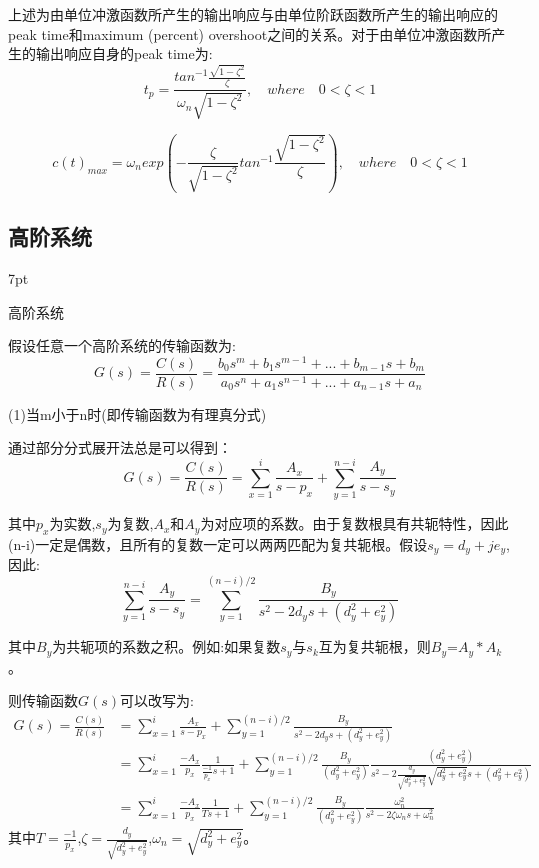 \documentclass{article}
\numberwithin{equation}{section}
\numberwithin{figure}{section}
\newenvironment{formal}{%
\def\FrameCommand{%
\hspace{1pt}%
{\color{DarkBlue}\vrule width 2pt}%
{\color{formalshade}\vrule width 4pt}%
\colorbox{formalshade}%
}%
\MakeFramed{\advance\hsize-\width\FrameRestore}%
\noindent\hspace{-4.55pt}%
\begin{adjustwidth}{}{7pt}%
\vspace{2pt}\vspace{2pt}%
}
{%
\vspace{2pt}\end{adjustwidth}\endMakeFramed%
}
\begin{document}
上述为由单位冲激函数所产生的输出响应与由单位阶跃函数所产生的输出响应的peak time和maximum (percent) overshoot之间的关系。对于由单位冲激函数所产生的输出响应自身的peak time为:
\begin{equation}
    t_p=\frac{tan^{-1}\frac{\sqrt{1-\zeta^2}}{\zeta}}{\omega_n\sqrt{1-\zeta^2}},\quad where\quad 0<\zeta<1
\end{equation}

\begin{equation}
    c(t)_{max}=\omega_nexp(-\frac{\zeta}{\sqrt{1-\zeta^2}}tan^{-1}\frac{\sqrt{1-\zeta^2}}{\zeta}),\quad where\quad 0<\zeta<1
\end{equation}

\subsection{高阶系统}

\begin{formal}
    高阶系统
\end{formal}

假设任意一个高阶系统的传输函数为:
\begin{equation}
    G(s)=\frac{C(s)}{R(s)}=\frac{b_0s^m+b_1s^{m-1}+...+b_{m-1}s+b_m}{a_0s^n+a_1s^{n-1}+...+a_{n-1}s+a_n}
\end{equation}

(1)当m小于n时(即传输函数为有理真分式)

通过部分分式展开法总是可以得到：
\begin{equation}
    G(s)=\frac{C(s)}{R(s)}=\sum_{x = 1}^{i}\frac{A_x}{s-p_x}+\sum_{y = 1}^{n-i}\frac{A_y}{s-s_y}
\end{equation}

其中$p_x$为实数,$s_y$为复数,$A_x$和$A_y$为对应项的系数。由于复数根具有共轭特性，因此(n-i)一定是偶数，且所有的复数一定可以两两匹配为复共轭根。假设$s_y=d_y+je_y$,因此:
\begin{equation}
    \sum_{y = 1}^{n-i}\frac{A_y}{s-s_y}=\sum_{y = 1}^{(n-i)/2}\frac{B_y}{s^2-2d_ys+(d_y^2+e_y^2)}
\end{equation}

其中$B_y$为共轭项的系数之积。例如:如果复数$s_y$与$s_k$互为复共轭根，则$B_y$=$A_y*A_k$。

则传输函数$G(s)$可以改写为:
\begin{equation}
    \begin{split}
        G(s)=\frac{C(s)}{R(s)}&=\sum_{x = 1}^{i}\frac{A_x}{s-p_x}+\sum_{y = 1}^{(n-i)/2}\frac{B_y}{s^2-2d_ys+(d_y^2+e_y^2)}\\
        &=\sum_{x = 1}^{i}\frac{-A_x}{p_x}\frac{1}{\frac{-1}{p_x}s+1}+\sum_{y = 1}^{(n-i)/2}\frac{B_y}{(d_y^2+e_y^2)}\frac{(d_y^2+e_y^2)}{s^2-2\frac{d_y}{\sqrt{d_y^2+e_y^2}}\sqrt{d_y^2+e_y^2}s+(d_y^2+e_y^2)}\\
        &=\sum_{x = 1}^{i}\frac{-A_x}{p_x}\frac{1}{Ts+1}+\sum_{y = 1}^{(n-i)/2}\frac{B_y}{(d_y^2+e_y^2)}\frac{\omega_n^2}{s^2-2\zeta\omega_ns+\omega_n^2}\label{highordertransferfunction}
    \end{split}
\end{equation}
其中$T=\frac{-1}{p_x}$,$\zeta=\frac{d_y}{\sqrt{d_y^2+e_y^2}}$,$\omega_n=\sqrt{d_y^2+e_y^2}$。
\end{document}
